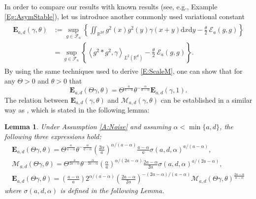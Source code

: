 \documentclass[12pt]{report}
\theoremstyle{plain}
\newtheorem{lemma}[theorem]{Lemma}
\theoremstyle{definition}
\numberwithin{equation}{section}
\newcommand{\R}{\mathbb{R}}
\newcommand{\ud}{\ensuremath{ \mathrm{d} }}
\begin{document}
In order to compare our results with known results (see, e.g., Example \ref{Eg:AsymStable}), let us
introduce another commonly used variational constant
\begin{align} \label{E:VarConstE}
\begin{aligned}
\mathbf{E}_{a,d}(\gamma,\theta)
& := \sup_{g \in \mathcal{F}_a} \left\{ \iint_{\R^{2d}} g^2(x)g^2(y) \gamma(x+y)\ud x\ud y - \frac{\theta}{2}\: \mathcal{E}_a(g,g) \right\} \\
& = \sup_{g \in \mathcal{F}_a} \left\{ \left\langle g^2 * g^2, \gamma \right\rangle_{L^2(\R^d)} - \frac{\theta}{2}\: \mathcal{E}_a(g,g) \right\}.
\end{aligned}
\end{align}
By using the same techniques used to derive \eqref{E:ScaleM}, one can show that for any $\Theta >0$
and $\theta>0$ that
\begin{equation}\label{E:ScaleE}
\mathbf{E}_{a,d}(\Theta\gamma,\theta)
= \Theta^{\frac{a}{a-\alpha}} \theta^{-\frac{\alpha}{a-\alpha}}  \mathbf{E}_{a,d}(\gamma,1).
\end{equation}
The relation between $\mathbf{E}_{a,d}(\gamma,\theta)$ and $\mathcal{M}_{a,d}(\gamma,\theta)$ can be
established in a similar way as \cite[Lemma A.2]{chen.hu.ea:15:exponential}, which is stated in the following lemma:

\begin{lemma} \label{L:EvsM}
	Under Assumption \ref{A:Noise} and assuming $\alpha <\min\{a,d\}$, the following three expressions hold:
	\begin{gather} \label{E:Erelation}
	\mathbf{E}_{a,d}(\Theta\gamma,\theta)
	= \Theta^{\frac{a}{a-\alpha}} \theta^{-\frac{\alpha}{a-\alpha}}\left(\frac{2\alpha}{a}\right)^{\alpha/(a-\alpha)}\frac{a-\alpha}{a}\sigma(a, d,\alpha)^{a/(a-\alpha)},        \\
	\label{E:Mrelation}
	\mathcal{M}_{a,d}(\Theta\gamma,\theta)
	= \Theta^{\frac{a}{2a-\alpha}}\theta^{-\frac{\alpha}{2a-\alpha}} \left( \frac{\alpha}{a}\right)^{\alpha/(2a-\alpha)} \frac{2a-\alpha}{2a}\sigma(a, d,\alpha)^{a/(2a-\alpha)}, \\
	\label{E:EvsM}
	\mathbf{E}_{a,d}(\Theta\gamma,\theta)
	= \left( \frac{a-\alpha}{a}\right) 2^{\alpha/(a-\alpha)}\left( \frac{2a-\alpha}{2a} \right)^{-(2a-\alpha)/(a-\alpha)} \mathcal{M}_{a,d}(\Theta\gamma,\theta)^{\frac{2a-\alpha}{a-\alpha}}
	\end{gather}
	where $\sigma(a, d,\alpha)$ is defined in the following Lemma.
\end{lemma}
\end{document}
